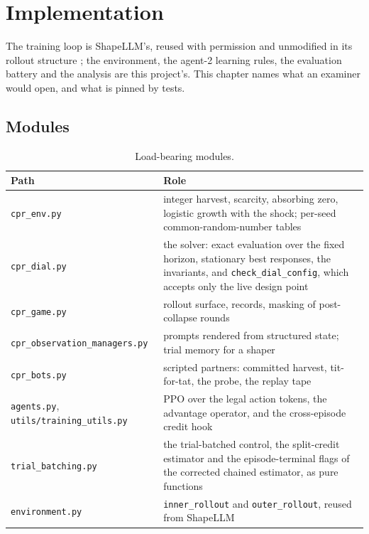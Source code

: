 \chapter{Implementation}
\label{ch:impl}


The training loop is ShapeLLM's, reused with permission and unmodified in
its rollout structure \cite{garciasegura2025}; the environment, the agent-2
learning rules, the evaluation battery and the analysis are this project's.
This chapter names what an examiner would open, and what is pinned by tests.

\section{Modules}
\label{sec:impl-modules}

\begin{table}[ht]
\centering\small
\caption{Load-bearing modules.}
\label{tab:modules}
\begin{tabularx}{\textwidth}{>{\raggedright\arraybackslash}p{4.7cm}X}
\toprule
Path & Role \\
\midrule
\texttt{cpr\_env.py} & integer harvest, scarcity, absorbing zero, logistic growth with the shock; per-seed common-random-number tables \\
\texttt{cpr\_dial.py} & the solver: exact evaluation over the fixed horizon, stationary best responses, the invariants, and \texttt{check\_dial\_config}, which accepts only the live design point \\
\texttt{cpr\_game.py} & rollout surface, records, masking of post-collapse rounds \\
\texttt{cpr\_observation\_managers.py} & prompts rendered from structured state; trial memory for a shaper \\
\texttt{cpr\_bots.py} & scripted partners: committed harvest, tit-for-tat, the probe, the replay tape \\
\texttt{agents.py}, \texttt{utils/training\_utils.py} & PPO over the legal action tokens, the advantage operator, and the cross-episode credit hook \\
\texttt{trial\_batching.py} & the trial-batched control, the split-credit estimator and the episode-terminal flags of the corrected chained estimator, as pure functions \\
\texttt{environment.py} & \texttt{inner\_rollout} and \texttt{outer\_rollout}, reused from ShapeLLM \\
\bottomrule
\end{tabularx}
\end{table}

